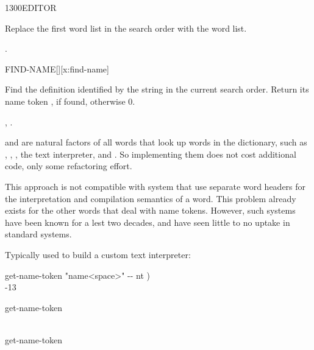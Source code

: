 \begin{worddef}{1300}{EDITOR}
\item \stack{}{}

	Replace the first word list in the search order with the
	 word list.

\see {}.
\end{worddef}


\begin{worddef}{}{FIND-NAME}[][x:find-name]
\item {}

Find the definition identified by the string  in the current
search order.  Return its name token , if found, otherwise 0.

\see {},
	.

\begin{rationale}
 and  are natural factors of all words that
look up words in the dictionary, such as , , ,
the text interpreter, and .  So implementing them
does not cost additional code, only some refactoring effort.

This approach is not compatible with system that use separate word headers for the
interpretation and compilation semantics of a word.  This problem already exists for
the other words that deal with name tokens.  However, such systems have been known
for a lest two decades, and have seen little to no uptake in standard systems.

Typically used to build a custom text interpreter:

\ttfamily
\word{:} get-name-token  "name<space>" -{}- nt ) \\
\tab[1]	    -13  \\
\word{;}

\word{:}  get-name-token   \word{;}

\word{:}  \\
\tab[1]	get-name-token     \\
\word{;} 


\end{rationale}
\end{worddef}
